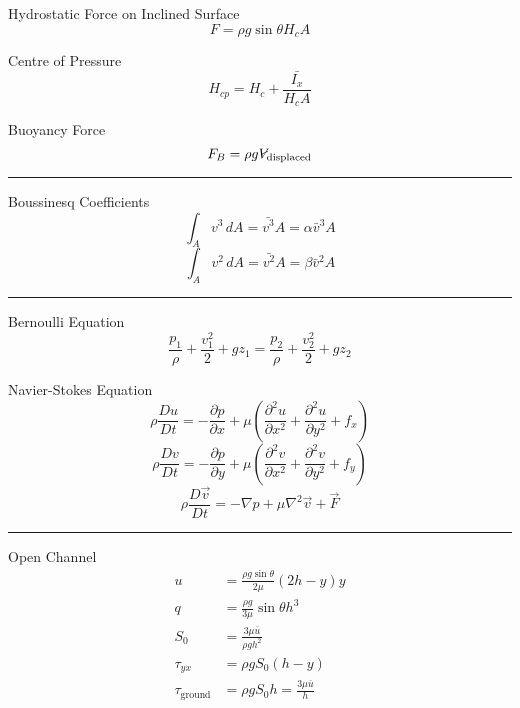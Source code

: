 \documentclass[twoside]{article}
\makeatletter
\DeclareRobustCommand{\vol}{\text{\volumedash}V}
\newcommand{\volumedash}{%
	\makebox[0pt][l]{%
		\ooalign{\hfil\hphantom{$\m@th V$}\hfil\cr\kern0.16em\rotatebox{27.5}{\textbf{--}}\hfil\cr}%
	}%
}
\numberwithin{equation}{section}
\makeatother
\begin{document}
	Hydrostatic Force on Inclined Surface
	\begin{equation*}
		F = \rho g \sin \theta H_c A
	\end{equation*}
	
	Centre of Pressure
	\begin{equation*}
		H_{cp} = H_c+\frac{\bar{I_x}}{H_c A}
	\end{equation*}
	
	Buoyancy Force
	\begin{equation*}
		F_B = \rho g \vol_{\text{displaced}}
	\end{equation*}
	
	\noindent\rule{\textwidth}{0.5pt}
	
	Boussinesq Coefficients
	\begin{equation*}
		\int_A v^3 \, dA = \bar{v^3} A = \alpha \bar{v}^3 A
	\end{equation*}
	\begin{equation*}
		\int_A v^2 \, dA = \bar{v^2} A = \beta \bar{v}^2 A
	\end{equation*}
	
	\noindent\rule{\textwidth}{0.5pt}
	
	Bernoulli Equation
	\begin{equation*}
		\frac{p_1}{\rho}+\frac{v_1^2}{2}+gz_1 = \frac{p_2}{\rho}+\frac{v_2^2}{2}+gz_2
	\end{equation*}
	
	Navier-Stokes Equation
	\begin{equation*}
		\rho \frac{Du}{Dt} = -\frac{\partial p}{\partial x}+\mu \left( \frac{\partial^2 u}{\partial x^2}+\frac{\partial^2 u}{\partial y^2}+f_x \right)
	\end{equation*}
	\begin{equation*}
		\rho \frac{Dv}{Dt} = -\frac{\partial p}{\partial y}+\mu \left( \frac{\partial^2 v}{\partial x^2}+\frac{\partial^2 v}{\partial y^2}+f_y \right)
	\end{equation*}
	\begin{equation*}
		\rho \frac{D\vec{v}}{Dt} = -\nabla p+\mu \nabla^2 \vec{v}+\vec{F}
	\end{equation*}
	
	\noindent\rule{\textwidth}{0.5pt}
	
	Open Channel
	\begin{align*}
		u &= \frac{\rho g \sin \theta}{2\mu} (2h-y)y \\
		q &= \frac{\rho g}{3\mu} \sin \theta h^3 \\
		S_0 &= \frac{3\mu \bar{u}}{\rho gh^2} \\
		\tau_{yx} &= \rho gS_0(h-y) \\
		\tau_{\text{ground}} &= \rho gS_0 h = \frac{3\mu \bar{u}}{h}
	\end{align*}
	
\end{document}
